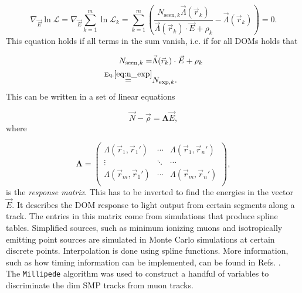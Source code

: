 \begin{equation}
\nabla_{\vec{E}} \ln \mathcal{L} = \nabla_{\vec{E}} \sum^m_{k=1} \ln \mathcal{L}_k = \sum^m_{k=1} \left(\frac{N_{\textrm{seen},k} \vec{\Lambda}(\vec{r}_k)}{\vec{\Lambda}(\vec{r}_k) \cdot \vec{E} + \rho_k} - \vec{\Lambda}(\vec{r}_k) \right) = 0.
\end{equation}
\noindent This equation holds if all terms in the sum vanish, i.e. if for all DOMs holds that

\begin{equation}
\begin{split}
N_{\textrm{seen},k} = &\vec{\Lambda}(\vec{r}_k) \cdot \vec{E} + \rho_k\\
\overset{\textrm{Eq.}\ref{eq:n_exp}}{=} &N_{\textrm{exp},k}
.
\end{split}
\end{equation}
\noindent This can be written in a set of linear equations

\begin{equation}
\vec{N} - \vec{\rho} = \mathbf{\Lambda} \vec{E}, 
\end{equation}
\noindent where

\begin{equation}
\mathbf{\Lambda} = 
\begin{pmatrix}
\Lambda(\vec{r}_1,\vec{r}_1') & \cdots & \Lambda(\vec{r}_1,\vec{r}_n')\\
\vdots  & \ddots & \cdots \\
\Lambda(\vec{r}_m,\vec{r}_1') & \cdots & \Lambda(\vec{r}_m,\vec{r}_n')\\
\end{pmatrix},
\end{equation}
\noindent is the \textit{response matrix}. This has to be inverted to find the energies in the vector $\vec{E}$. It describes the DOM response to light output from certain segments along a track. The entries in this matrix come from simulations that produce spline tables. Simplified sources, such as minimum ionizing muons and isotropically emitting point sources are simulated in Monte Carlo simulations at certain discrete points. Interpolation is done using spline functions. More information, such as how timing information can be implemented, can be found in Refs. \cite{millipedeinternal2,stefthesis}.\\

\noindent The \texttt{Millipede} algorithm was used to construct a handful of variables to discriminate the dim SMP tracks from muon tracks.

